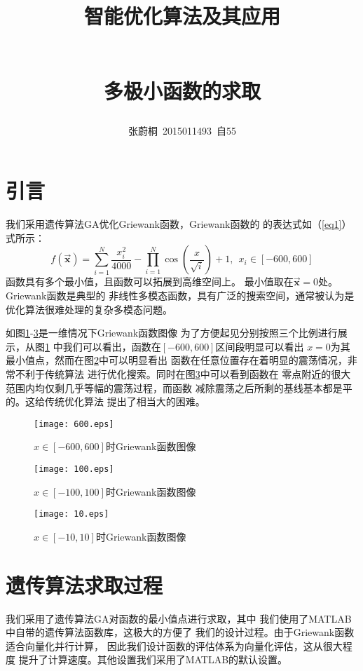 \documentclass[UTF8,a4paper]{paper}
\title{\begin{large} 智能优化算法及其应用\end{large}
\\ 多极小函数的求取}
\author{张蔚桐\ 2015011493\ 自55}
\begin{document}
\maketitle
\section{引言}
我们采用遗传算法GA优化Griewank函数，Griewank函数的
的表达式如（\ref{eq1}）式所示：
\begin{equation}\label{eq1}
f(\vec{\bm x}) = \sum_{i=1}^N\frac{x_i^2}{4000} 
- \prod_{i=1}^N\cos(\frac{x}{\sqrt i}) + 1
,\ \ x_i\in[-600,600]
\end{equation}
函数具有多个最小值，且函数可以拓展到高维空间上。
最小值取在$\vec{\bm x}=0$处。Griewank函数是典型的
非线性多模态函数，具有广泛的搜索空间，通常被认为是
优化算法很难处理的复杂多模态问题。

如图\ref{f1}-\ref{f3}是一维情况下Griewank函数图像
为了方便起见分别按照三个比例进行展示，从图\ref{f1}
中我们可以看出，函数在$[-600,600]$区间段明显可以看出
$x=0$为其最小值点，然而在图\ref{f2}中可以明显看出
函数在任意位置存在着明显的震荡情况，非常不利于传统算法
进行优化搜索。同时在图\ref{f3}中可以看到函数在
零点附近的很大范围内均仅剩几乎等幅的震荡过程，而函数
减除震荡之后所剩的基线基本都是平的。这给传统优化算法
提出了相当大的困难。

\begin{multicols}{3}
\begin{figure}[H]
\texttt{[image: 600.eps]}
\caption{$x\in[-600,600]$时Griewank函数图像}
\label{f1}
\end{figure}
\begin{figure}[H]
\texttt{[image: 100.eps]}
\caption{$x\in[-100,100]$时Griewank函数图像}
\label{f2}
\end{figure}
\begin{figure}[H]
\texttt{[image: 10.eps]}
\caption{$x\in[-10,10]$时Griewank函数图像}
\label{f3}
\end{figure}
\end{multicols}
\section{遗传算法求取过程}
我们采用了遗传算法GA对函数的最小值点进行求取，其中
我们使用了MATLAB中自带的遗传算法函数库，这极大的方便了
我们的设计过程。由于Griewank函数适合向量化并行计算，
因此我们设计函数的评估体系为向量化评估，这从很大程度
提升了计算速度。其他设置我们采用了MATLAB的默认设置。
\end{document}
